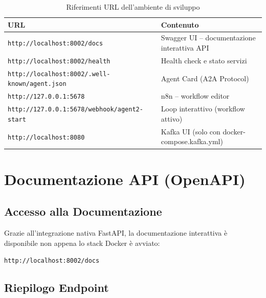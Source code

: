 \documentclass[12pt,a4paper]{report}
\begin{document}
\begin{table}[H]
\centering
\renewcommand{\arraystretch}{1.3}
\begin{tabularx}{\textwidth}{l X}
\toprule
\textbf{URL} & \textbf{Contenuto} \\
\midrule
\texttt{http://localhost:8002/docs}                   & Swagger UI -- documentazione interattiva API \\
\texttt{http://localhost:8002/health}                 & Health check e stato servizi \\
\texttt{http://localhost:8002/.well-known/agent.json} & Agent Card (A2A Protocol) \\
\texttt{http://127.0.0.1:5678}                        & n8n -- workflow editor \\
\texttt{http://127.0.0.1:5678/webhook/agent2-start}   & Loop interattivo (workflow attivo) \\
\texttt{http://localhost:8080}                        & Kafka UI (solo con docker-compose.kafka.yml) \\
\bottomrule
\end{tabularx}
\caption{Riferimenti URL dell'ambiente di sviluppo}
\label{tab:urls}
\end{table}

\chapter{Documentazione API (OpenAPI)}

\section{Accesso alla Documentazione}

Grazie all'integrazione nativa FastAPI, la documentazione interattiva è
disponibile non appena lo stack Docker è avviato:

\begin{center}
\texttt{http://localhost:8002/docs}
\end{center}

\section{Riepilogo Endpoint}
\end{document}
